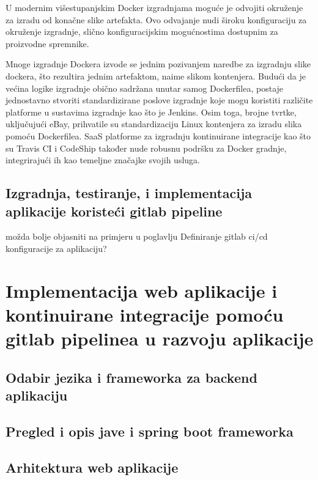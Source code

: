 \documentclass[a4paper,12pt,oneside]{article}
\begin{document}
U modernim višestupanjskim Docker izgradnjama moguće je odvojiti okruženje za izradu od konačne slike artefakta. Ovo odvajanje nudi široku konfiguraciju za okruženje izgradnje, slično konfiguracijskim mogućnostima dostupnim za proizvodne spremnike.

Mnoge izgradnje Dockera izvode se jednim pozivanjem naredbe za izgradnju slike dockera, što rezultira jednim artefaktom, naime slikom kontenjera. Budući da je većina logike izgradnje obično sadržana unutar samog Dockerfilea, postaje jednostavno stvoriti standardizirane poslove izgradnje koje mogu koristiti različite platforme u sustavima izgradnje kao što je Jenkins. Osim toga, brojne tvrtke, uključujući eBay, prihvatile su standardizaciju Linux kontenjera za izradu slika pomoću Dockerfilea. SaaS platforme za izgradnju kontinuirane integracije kao što su Travis CI i CodeShip također nude robusnu podršku za Docker gradnje, integrirajući ih kao temeljne značajke svojih usluga.

\newpage

\subsection{Izgradnja, testiranje, i implementacija aplikacije koristeći gitlab pipeline}

možda bolje objasniti na primjeru u poglavlju Definiranje gitlab ci/cd konfiguracije za aplikaciju?

\newpage

\section{Implementacija web aplikacije i kontinuirane integracije pomoću gitlab pipelinea u razvoju aplikacije}

 

\subsection{Odabir jezika i frameworka za backend aplikaciju}


\subsection{Pregled i opis jave i spring boot frameworka}


\subsection{Arhitektura web aplikacije}
\end{document}
